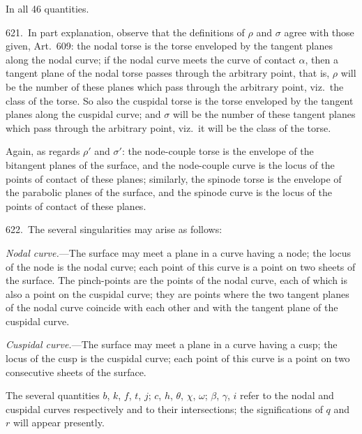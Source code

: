 \documentclass[11pt,a4paper]{article}
\theoremstyle{plain}
\theoremstyle{definition}
\theoremstyle{remark}
\begin{document}
\smallskip

In all 46 quantities.

\newpage
\setcounter{page}{612}

621.\ In part explanation, observe that the definitions of $\rho$ and $\sigma$ agree with those given, Art.~609: the nodal torse is the torse enveloped by the tangent planes along the nodal curve; if the nodal curve meets the curve of contact $\alpha$, then a tangent plane of the nodal torse passes through the arbitrary point, that is, $\rho$ will be the number of these planes which pass through the arbitrary point, viz.\ the class of the torse. So also the cuspidal torse is the torse enveloped by the tangent planes along the cuspidal curve; and $\sigma$ will be the number of these tangent planes which pass through the arbitrary point, viz.\ it will be the class of the torse.

Again, as regards $\rho'$ and $\sigma'$: the node-couple torse is the envelope of the bitangent planes of the surface, and the node-couple curve is the locus of the points of contact of these planes; similarly, the spinode torse is the envelope of the parabolic planes of the surface, and the spinode curve is the locus of the points of contact of these planes.

622.\ The several singularities may arise as follows:

\textit{Nodal curve.}---The surface may meet a plane in a curve having a node; the locus of the node is the nodal curve; each point of this curve is a point on two sheets of the surface. The pinch-points are the points of the nodal curve, each of which is also a point on the cuspidal curve; they are points where the two tangent planes of the nodal curve coincide with each other and with the tangent plane of the cuspidal curve.

\textit{Cuspidal curve.}---The surface may meet a plane in a curve having a cusp; the locus of the cusp is the cuspidal curve; each point of this curve is a point on two consecutive sheets of the surface.

The several quantities $b$, $k$, $f$, $t$, $j$; $c$, $h$, $\theta$, $\chi$, $\omega$; $\beta$, $\gamma$, $i$ refer to the nodal and cuspidal curves respectively and to their intersections; the significations of $q$ and $r$ will appear presently.

\newpage
\setcounter{page}{613}
\end{document}
